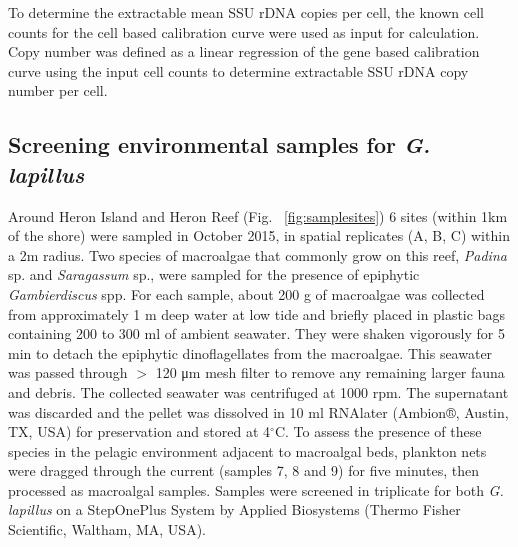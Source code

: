 \documentclass[12pt]{article}
\begin{document}
To determine the extractable mean SSU rDNA copies per cell, the known cell counts for the cell based calibration curve were used as input for calculation. 
Copy number was defined as a linear regression of the gene based calibration curve using the input cell counts to determine extractable SSU rDNA copy number per cell.

\subsection*{Screening environmental samples for \emph{G. lapillus}}%
\FloatBarrier
Around Heron Island and Heron Reef (Fig. ~\ref{fig:samplesites}) 6 sites (within 1km of the shore) were sampled in October 2015, in spatial replicates (A, B, C) within a 2m radius. 
Two species of macroalgae that commonly grow on this reef, \textit{Padina} sp. and \textit{Saragassum} sp., were sampled for the presence of epiphytic \emph{Gambierdiscus} spp. For each sample, about 200 g of macroalgae was collected from approximately 1 m deep water at low tide and briefly placed in plastic bags containing 200 to 300 ml of ambient seawater. 
They were shaken vigorously for 5 min to detach the epiphytic dinoflagellates from the macroalgae. 
This seawater was passed through $>$ 120 μm mesh filter to remove any remaining larger fauna and debris. 
The collected seawater was centrifuged at 1000 rpm. The supernatant was discarded and the pellet was dissolved in 10 ml RNAlater (Ambion®, Austin, TX, USA) for preservation and stored at 4$^{\circ}$C.
To assess the presence of these species in the pelagic environment adjacent to macroalgal beds, plankton nets were dragged through the current (samples 7, 8 and 9) for five minutes, then processed as macroalgal samples.
Samples were screened in triplicate for both \emph{G. lapillus} %
on a StepOnePlus System by Applied Biosystems (Thermo Fisher Scientific, Waltham, MA, USA).
\end{document}
